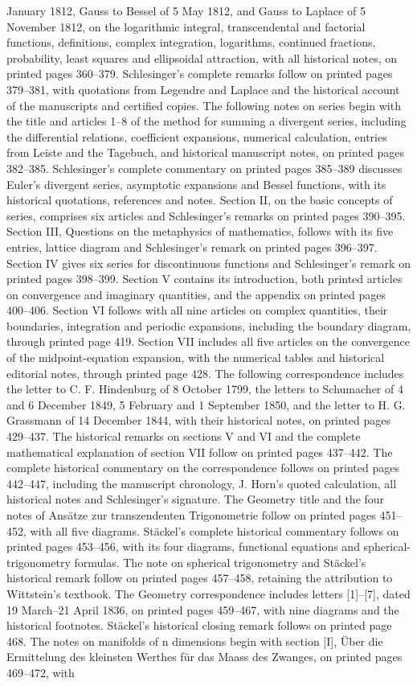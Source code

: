 January 1812, Gauss to Bessel of 5 May 1812, and Gauss to Laplace of 5 November 1812, on the logarithmic integral, transcendental and factorial functions, definitions, complex integration, logarithms, continued fractions, probability, least squares and ellipsoidal attraction, with all historical notes, on printed pages 360–379. Schlesinger’s complete remarks follow on printed pages 379–381, with quotations from Legendre and Laplace and the historical account of the manuscripts and certified copies. The following notes on series begin with the title and articles 1–8 of the method for summing a divergent series, including the differential relations, coefficient expansions, numerical calculation, entries from Leiste and the Tagebuch, and historical manuscript notes, on printed pages 382–385. Schlesinger’s complete commentary on printed pages 385–389 discusses Euler’s divergent series, asymptotic expansions and Bessel functions, with its historical quotations, references and notes. Section II, on the basic concepts of series, comprises six articles and Schlesinger’s remarks on printed pages 390–395. Section III, Questions on the metaphysics of mathematics, follows with its five entries, lattice diagram and Schlesinger’s remark on printed pages 396–397. Section IV gives six series for discontinuous functions and Schlesinger’s remark on printed pages 398–399. Section V contains its introduction, both printed articles on convergence and imaginary quantities, and the appendix on printed pages 400–406. Section VI follows with all nine articles on complex quantities, their boundaries, integration and periodic expansions, including the boundary diagram, through printed page 419. Section VII includes all five articles on the convergence of the midpoint-equation expansion, with the numerical tables and historical editorial notes, through printed page 428. The following correspondence includes the letter to C. F. Hindenburg of 8 October 1799, the letters to Schumacher of 4 and 6 December 1849, 5 February and 1 September 1850, and the letter to H. G. Grassmann of 14 December 1844, with their historical notes, on printed pages 429–437. The historical remarks on sections V and VI and the complete mathematical explanation of section VII follow on printed pages 437–442. The complete historical commentary on the correspondence follows on printed pages 442–447, including the manuscript chronology, J. Horn’s quoted calculation, all historical notes and Schlesinger’s signature. The Geometry title and the four notes of Ansätze zur transzendenten Trigonometrie follow on printed pages 451–452, with all five diagrams. Stäckel’s complete historical commentary follows on printed pages 453–456, with its four diagrams, functional equations and spherical-trigonometry formulas. The note on spherical trigonometry and Stäckel’s historical remark follow on printed pages 457–458, retaining the attribution to Wittstein’s textbook. The Geometry correspondence includes letters [1]–[7], dated 19 March–21 April 1836, on printed pages 459–467, with nine diagrams and the historical footnotes. Stäckel’s historical closing remark follows on printed page 468. The notes on manifolds of n dimensions begin with section [I], Über die Ermittelung des kleinsten Werthes für das Maass des Zwanges, on printed pages 469–472, with 